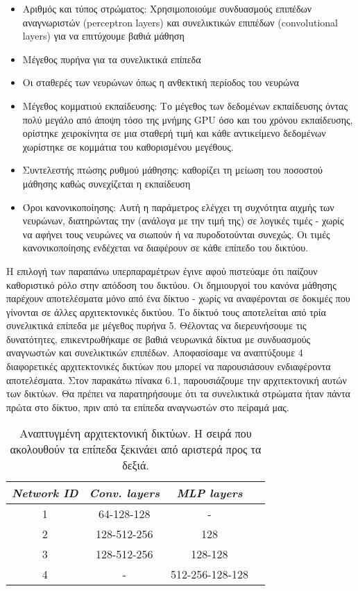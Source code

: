 \documentclass[12pt]{report}
\begin{document}
\begin{itemize}
    \item Αριθμός και τύπος στρώματος: Χρησιμοποιούμε συνδυασμούς επιπέδων αναγνωριστών (\textlatin{perceptron layers}) και συνελικτικών επιπέδων (\textlatin{convolutional layers}) για να επιτύχουμε βαθιά μάθηση
    \item Μέγεθος πυρήνα για τα συνελικτικά επίπεδα
    \item Οι σταθερές των νευρώνων όπως η ανθεκτική περίοδος του νευρώνα
    \item Μέγεθος κομματιού εκπαίδευσης: Το μέγεθος των δεδομένων εκπαίδευσης όντας πολύ μεγάλο από άποψη τόσο της μνήμης \textlatin{GPU} όσο και του χρόνου εκπαίδευσης, ορίστηκε χειροκίνητα σε μια σταθερή τιμή και κάθε αντικείμενο δεδομένων χωρίστηκε σε κομμάτια του καθορισμένου μεγέθους.
    \item Συντελεστής πτώσης ρυθμού μάθησης: καθορίζει τη μείωση του ποσοστού μάθησης καθώς συνεχίζεται η εκπαίδευση
    \item Όροι κανονικοποίησης: Αυτή η παράμετρος ελέγχει τη συχνότητα αιχμής των νευρώνων, διατηρώντας την (ανάλογα με την τιμή της) σε λογικές τιμές - χωρίς να αφήνει τους νευρώνες να σιωπούν ή να πυροδοτούνται συνεχώς. Οι τιμές κανονικοποίησης ενδέχεται να διαφέρουν σε κάθε επίπεδο του δικτύου.
\end{itemize}

Η επιλογή των παραπάνω υπερπαραμέτρων έγινε αφού πιστεύαμε ότι παίζουν καθοριστικό ρόλο στην απόδοση του δικτύου. Οι δημιουργοί του κανόνα μάθησης παρέχουν αποτελέσματα μόνο από ένα δίκτυο - χωρίς να αναφέρονται σε δοκιμές που γίνονται σε άλλες αρχιτεκτονικές δικτύου. Το δίκτυό τους αποτελείται από τρία συνελικτικά επίπεδα με μέγεθος πυρήνα 5. Θέλοντας να διερευνήσουμε τις δυνατότητες, επικεντρωθήκαμε σε βαθιά νευρωνικά δίκτυα με συνδυασμούς αναγνωστών και συνελικτικών επιπέδων. Αποφασίσαμε να αναπτύξουμε 4 διαφορετικές αρχιτεκτονικές δικτύων που μπορεί να παρουσιάσουν ενδιαφέροντα αποτελέσματα. Στον παρακάτω πίνακα 6.1, παρουσιάζουμε την αρχιτεκτονική αυτών των δικτύων. Θα πρέπει να παρατηρήσουμε ότι τα συνελικτικά στρώματα ήταν πάντα πρώτα στο δίκτυο, πριν από τα επίπεδα αναγνωστών στο πείραμά μας.

\begin{table}[htbp]
\centering
\begin{tabular}{||c||c|c|c||}
\hline
{\textit{\textbf{\textlatin{Network ID}}}} & {\textit{\textbf{\textlatin{Conv. layers}}}} & {\textit{\textbf{\textlatin{MLP layers}}}} \tabularnewline \hline
1 & 64-128-128 & -\tabularnewline \hline
2 & 128-512-256 & 128\tabularnewline \hline
3 & 128-512-256 & 128-128\tabularnewline \hline
4 & - & 512-256-128-128\tabularnewline \hline
\end{tabular}
\caption{Αναπτυγμένη αρχιτεκτονική δικτύων. Η σειρά που ακολουθούν τα επίπεδα ξεκινάει από αριστερά προς τα δεξιά.}
\label{table:economicSchools2}   
\end{table}
\end{document}
